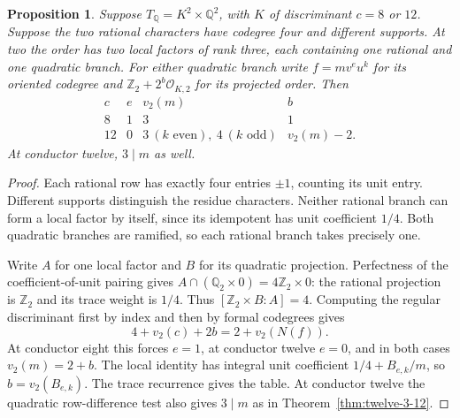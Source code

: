 \documentclass[11pt,reqno]{amsart}
\newtheorem{proposition}[theorem]{Proposition}
\theoremstyle{remark}\newtheorem{remark}[theorem]{Remark}
\numberwithin{equation}{section}
\begin{document}
\begin{proposition}\label{prop:twelve-four-four-dyadic}
Suppose $T_{\mathbb Q}=K^2\times\mathbb Q^2$, with $K$ of discriminant
$c=8$ or $12$. Suppose the two rational characters have codegree four
and different supports. At two the order has two local factors of
rank three, each containing one rational and one quadratic branch.
For either quadratic branch write $f=mv^eu^k$ for its oriented
codegree and $\mathbb Z_2+2^b\mathcal O_{K,2}$ for its projected order.
Then
\[
\begin{array}{c|c|c|c}
 c & e & v_2(m)& b\\ \hline
 8&1&3&1\\
 12&0&3\ (k\text{ even}),\ 4\ (k\text{ odd})&v_2(m)-2 .
\end{array}
\]
At conductor twelve, $3\mid m$ as well.
\end{proposition}
\begin{proof}
Each rational row has exactly four entries $\pm1$, counting its
unit entry. Different supports distinguish the residue characters.
Neither rational branch can form a local factor by itself, since
its idempotent has unit coefficient $1/4$. Both quadratic branches
are ramified, so each rational branch takes precisely one.

Write $A$ for one local factor and $B$ for its quadratic projection.
Perfectness of the coefficient-of-unit pairing gives
$A\cap(\mathbb Q_2\times0)=4\mathbb Z_2\times0$:
the rational projection is $\mathbb Z_2$ and its trace weight is $1/4$.
Thus $[\mathbb Z_2\times B:A]=4$. Computing the regular discriminant
first by index and then by formal codegrees gives
\[
 4+v_2(c)+2b=2+v_2(N(f)).
\]
At conductor eight this forces $e=1$, at conductor twelve $e=0$,
and in both cases $v_2(m)=2+b$. The local identity has integral
unit coefficient $1/4+B_{e,k}/m$, so $b=v_2(B_{e,k})$.
The trace recurrence gives the table. At conductor twelve the
quadratic row-difference test also gives $3\mid m$ as in
Theorem~\ref{thm:twelve-3-12}.
\end{proof}
\end{document}
